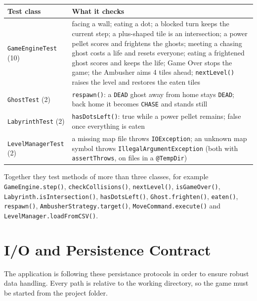 \documentclass[11pt, a4paper]{article}
\begin{document}
\vspace{0.1cm}
\begin{tabular}{@{}p{3.6cm}p{11.2cm}@{}}
    \toprule
    \textbf{Test class} & \textbf{What it checks} \\
    \midrule
    \texttt{GameEngineTest} (10) & facing a wall; eating a dot; a blocked turn keeps the current step; a plus-shaped tile is an intersection; a power pellet scores and frightens the ghosts; meeting a chasing ghost costs a life and resets everyone; eating a frightened ghost scores and keeps the life; Game Over stops the game; the Ambusher aims 4 tiles ahead; \texttt{nextLevel()} raises the level and restores the eaten tiles \\
    \texttt{GhostTest} (2) & \texttt{respawn()}: a \texttt{DEAD} ghost away from home stays \texttt{DEAD}; back home it becomes \texttt{CHASE} and stands still \\
    \texttt{LabyrinthTest} (2) & \texttt{hasDotsLeft()}: true while a power pellet remains; false once everything is eaten \\
    \texttt{LevelManagerTest} (2) & a missing map file throws \texttt{IOException}; an unknown map symbol throws \texttt{IllegalArgumentException} (both with \texttt{assertThrows}, on files in a \texttt{@TempDir}) \\
    \bottomrule
\end{tabular}
\vspace{0.1cm}

{\sloppy Together they test methods of more than three classes, for example \texttt{GameEngine.step()}, \texttt{checkCollisions()}, \texttt{nextLevel()}, \texttt{isGameOver()}, \texttt{Labyrinth.isIntersection()}, \texttt{hasDotsLeft()}, \texttt{Ghost.frighten()}, \texttt{eaten()}, \texttt{respawn()}, \texttt{AmbusherStrategy.target()}, \texttt{MoveCommand.execute()} and \texttt{LevelManager.loadFromCSV()}.
\par}
\clearpage

\section{I/O and Persistence Contract}
\label{sec:io}
The application is following these persistance protocols in order to ensure robust data handling. Every path is relative to the working directory, so the game must be started from the project folder.
\end{document}
